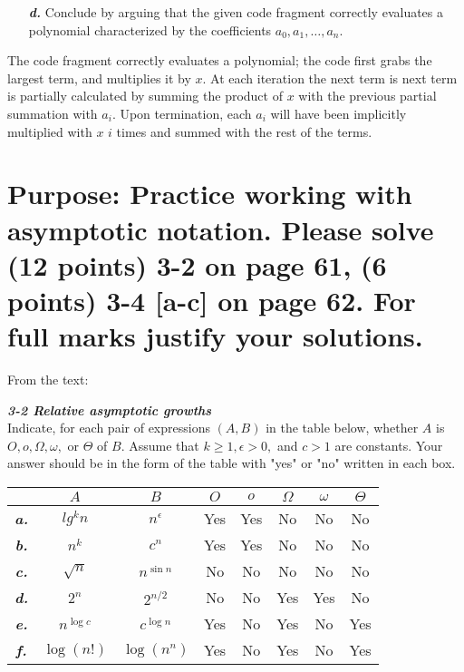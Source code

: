 \documentclass[a4paper,11pt]{article}
\theoremstyle{mytheor}
\begin{document}
\begin{framed}
    \begin{enumerate}
        \item[\textbf{\textit{d.}}] Conclude by arguing that the given code 
            fragment correctly evaluates a polynomial characterized by the 
            coefficients $a_0, a_1, \ldots, a_n$.
    \end{enumerate}
\end{framed}

The code fragment correctly evaluates a polynomial; the code first grabs the 
largest term, and multiplies it by $x$. At each iteration the next term is next
term is partially calculated by summing the product of $x$ with the previous 
partial summation with $a_i$. Upon termination, each $a_i$ will have been 
implicitly multiplied with $x$ $i$ times and summed with the rest of the terms.


\clearpage




\section{Purpose: Practice working with asymptotic notation. Please solve (12
points) 3-2 on page 61, (6 points) 3-4 [a-c] on page 62. For full marks justify 
your solutions.}

From the text: 

\begin{framed}
    \textbf{\textit{3-2 Relative asymptotic growths}} \\
    Indicate, for each pair of expressions $(A, B)$ in the table below, whether
    $A$ is $O, o, \Omega, \omega,$ or $\Theta$ of $B$. Assume that $k \ge 1,
    \epsilon > 0,$ and $c > 1$ are constants. Your answer should be in the form
    of the table with "yes" or "no" written in each box.
\end{framed}
\begin{tabular}{c c c | c | c | c | c | c |}
     & $A$ & $B$ & $O$ & $o$ & $\Omega$ & $\omega$ & $\Theta$ \\ \hline
    \textbf{\textit{a.}} & $lg^k n$ & $n^\epsilon$ & Yes & Yes & No & No & No \\ 
    \hline
    \textbf{\textit{b.}} & $n^k$ & $c^n$ & Yes & Yes & No & No & No \\
    \hline
    \textbf{\textit{c.}} & $\sqrt{n}$ & $n^{\sin n}$ & No & No & No & No & No \\
    \hline
    \textbf{\textit{d.}} & $2^n$ & $2^{n/2}$ & No & No & Yes & Yes & No \\
    \hline
    \textbf{\textit{e.}} & $n^{\log c}$ & $c^{\log n}$ & Yes & No & Yes & No & 
    Yes
    \\ \hline
    \textbf{\textit{f.}} & $\log (n!)$ & $\log (n^n)$ & Yes & No & Yes & No & 
    Yes \\ 
    \hline
\end{tabular}
\end{document}
